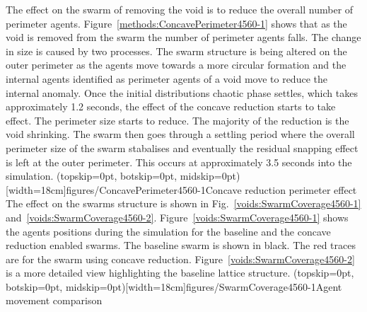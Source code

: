 \documentclass{ieeeaccess}
\begin{document}
The effect on the swarm of removing the void is to reduce the overall number of perimeter agents. Figure~\ref{methods:ConcavePerimeter4560-1} shows that as the void is removed from the swarm the number of perimeter agents falls. The change in size is caused by two processes. The swarm structure is being altered on the outer perimeter as the agents move towards a more circular formation and the internal agents identified as perimeter agents of a void move to reduce the internal anomaly. 
Once the initial distributions chaotic phase settles, which takes approximately 1.2 seconds, the effect of the concave reduction starts to take effect. The perimeter size starts to reduce. The majority of the reduction is the void shrinking. The swarm then goes through a settling period where the overall perimeter size of the swarm stabalises and eventually the residual snapping effect is left at the outer perimeter. This occurs at approximately 3.5 seconds into the simulation. 
\Figure[t!](topskip=0pt, botskip=0pt, midskip=0pt)[width=18cm]{figures/ConcavePerimeter4560-1}{Concave reduction perimeter effect\label{methods:ConcavePerimeter4560-1}}
The effect on the swarms structure is shown in Fig.~\ref{voids:SwarmCoverage4560-1} and~\ref{voids:SwarmCoverage4560-2}. Figure~\ref{voids:SwarmCoverage4560-1} shows the agents positions during the simulation for the baseline and the concave reduction enabled swarms. The baseline swarm is shown in black. The red traces are for the swarm using concave reduction. Figure~\ref{voids:SwarmCoverage4560-2} is a more detailed view highlighting the baseline lattice structure.
\Figure[t!](topskip=0pt, botskip=0pt, midskip=0pt)[width=18cm]{figures/SwarmCoverage4560-1}{Agent movement comparison\label{voids:SwarmCoverage4560-1}}
\end{document}
